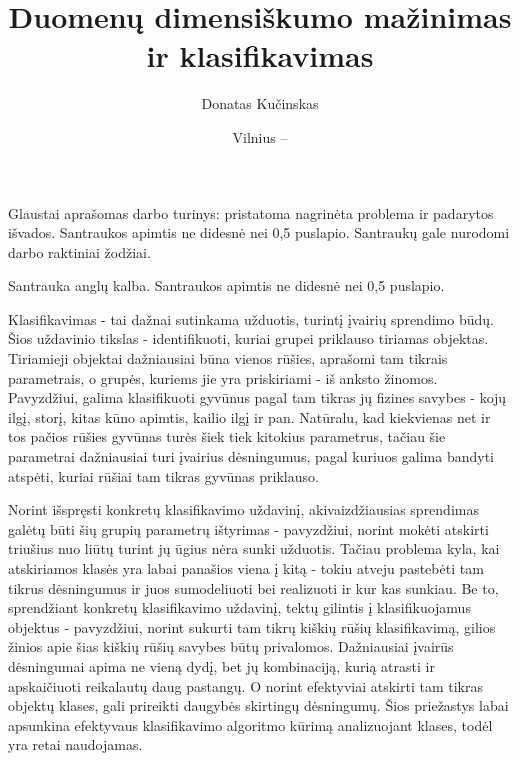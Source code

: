 \documentclass{VUMIFPSbakalaurinis}
\title{Duomenų dimensiškumo mažinimas ir klasifikavimas}
\author{Donatas Kučinskas}
\date{Vilnius – \the\year}
\begin{document}
\maketitle

\setcounter{page}{2}

Glaustai aprašomas darbo turinys: pristatoma nagrinėta problema ir padarytos
išvados. Santraukos apimtis ne didesnė nei 0,5 puslapio. Santraukų gale
nurodomi darbo raktiniai žodžiai. 


Santrauka anglų kalba. Santraukos apimtis ne didesnė nei 0,5 puslapio.


\tableofcontents

Klasifikavimas - tai dažnai sutinkama užduotis, turintį įvairių sprendimo būdų.
Šios uždavinio tikslas - identifikuoti, kuriai grupei priklauso tiriamas objektas.
Tiriamieji objektai dažniausiai būna vienos rūšies, aprašomi tam tikrais parametrais, o grupės, kuriems jie yra priskiriami - iš anksto žinomos.
Pavyzdžiui, galima klasifikuoti gyvūnus pagal tam tikras jų fizines savybes - kojų ilgį, storį, kitas kūno apimtis, kailio ilgį ir pan.
Natūralu, kad kiekvienas net ir tos pačios rūšies gyvūnas turės šiek tiek kitokius parametrus, tačiau šie parametrai dažniausiai turi įvairius dėsningumus, pagal kuriuos galima bandyti atspėti, kuriai rūšiai tam tikras gyvūnas priklauso.


Norint išspręsti konkretų klasifikavimo uždavinį, akivaizdžiausias sprendimas galėtų būti šių grupių parametrų ištyrimas - pavyzdžiui, norint mokėti atskirti triušius nuo liūtų turint jų ūgius nėra sunki užduotis.
Tačiau problema kyla, kai atskiriamos klasės yra labai panašios viena į kitą - tokiu atveju pastebėti tam tikrus dėsningumus ir juos sumodeliuoti bei realizuoti ir kur kas sunkiau.
Be to, sprendžiant konkretų klasifikavimo uždavinį, tektų gilintis į klasifikuojamus objektus - pavyzdžiui, norint sukurti tam tikrų kiškių rūšių klasifikavimą, gilios žinios apie šias kiškių rūšių savybes būtų privalomos.
Dažniausiai įvairūs dėsningumai apima ne vieną dydį, bet jų kombinaciją, kurią atrasti ir apskaičiuoti reikalautų daug pastangų.
O norint efektyviai atskirti tam tikras objektų klases, gali prireikti daugybės skirtingų dėsningumų.
Šios priežastys labai apsunkina efektyvaus klasifikavimo algoritmo kūrimą analizuojant klases, todėl yra retai naudojamas.
\end{document}
